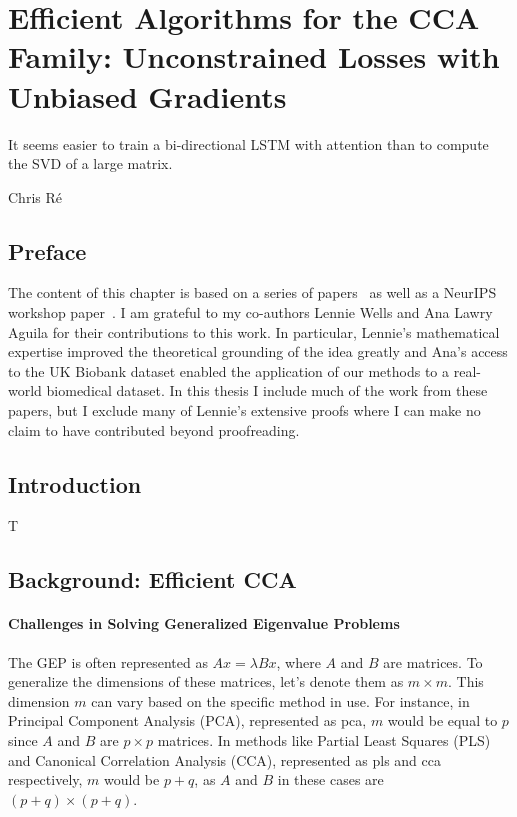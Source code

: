 \graphicspath{{chapters/gradient_descent/}}


\chapter{Efficient Algorithms for the CCA Family: Unconstrained Losses with Unbiased Gradients}\label{chap:gradient_descent}
\epigraph{It seems easier to train a bi-directional LSTM with attention than to compute the SVD of a large matrix.\cite{gemp}}{Chris Ré}
\minitoc
\section*{Preface}
The content of this chapter is based on a series of papers~\citep{chapman2022generalized, chapman2023efficient} as well as a NeurIPS workshop paper~\citep{chapman2023neurips}.
I am grateful to my co-authors Lennie Wells and Ana Lawry Aguila for their contributions to this work.
In particular, Lennie's mathematical expertise improved the theoretical grounding of the idea greatly and Ana's access to the UK Biobank dataset enabled the application of our methods to a real-world biomedical dataset.
In this thesis I include much of the work from these papers, but I exclude many of Lennie's extensive proofs where I can make no claim to have contributed beyond proofreading.

\section{Introduction}

T


\section{Background: Efficient CCA}\label{sec:background-unified}

\subsubsection{Challenges in Solving Generalized Eigenvalue Problems}

The GEP is often represented as \( Ax = \lambda Bx \), where \( A \) and \( B \) are matrices. To generalize the dimensions of these matrices, let's denote them as \( m \times m \). This dimension \( m \) can vary based on the specific method in use. For instance, in Principal Component Analysis (PCA), represented as \acrshort{pca}, \( m \) would be equal to \( p \) since \( A \) and \( B \) are \( p \times p \) matrices. In methods like Partial Least Squares (PLS) and Canonical Correlation Analysis (CCA), represented as \acrshort{pls} and \acrshort{cca} respectively, \( m \) would be \( p+q \), as \( A \) and \( B \) in these cases are \( (p+q) \times (p+q) \).


